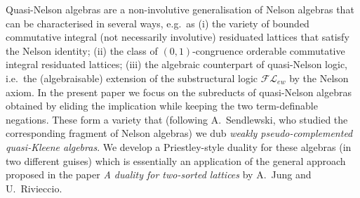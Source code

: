 
Quasi-Nelson algebras are a non-involutive generalisation of Nelson algebras that
can be %
characterised in several %
ways,
e.g.~as (i) the variety of bounded commutative integral (not necessarily involutive)  residuated lattices that satisfy the Nelson identity; %
(ii) the class of $(0,1)$-congruence orderable commutative integral  residuated lattices; %
(iii) the algebraic counterpart of quasi-Nelson logic, i.e.~the 
(algebraisable) extension of the substructural logic
$\mathcal{FL}_{ew}$ %
by the Nelson axiom. 
In the present paper  we focus on the subreducts of quasi-Nelson algebras
obtained by eliding the implication while keeping the two term-definable negations.
These form a variety %
that 
(following A.~Sendlewski, who studied the corresponding fragment of Nelson algebras)
we dub \emph{weakly pseudo-complemented quasi-Kleene algebras}.
We develop a Priestley-style duality  for these algebras (in two different guises)
which is essentially an application of the %
general approach %
proposed in the paper \emph{A duality for two-sorted lattices}
by A.~Jung and U.~Rivieccio.



